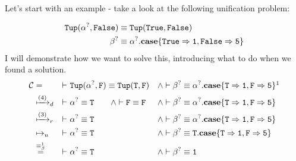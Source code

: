 \documentclass[twoside,12pt,a4paper]{article}
\begin{document}
Let's start with an example - take a look at the following unification problem:
\begin{example}[Unification]
    \begin{align*}
        \mathtt{Tup(\alpha^?, False)}&\equiv \mathtt{Tup(True, False)}\\
        \beta^?&\equiv \alpha^?.\textbf{case}\{\mathtt{True \Rightarrow 1, False\Rightarrow 5}\}
    \end{align*}        
    I will demonstrate how we want to solve this, introducing what to do when we found a solution.   
    \begin{align*}
        \constraints &= &\vdash\ & \mathtt{Tup(\alphaunifvar, F)}\equiv \mathtt{Tup(T, F)}&\wedge&
        \vdash \betaunifvar\equiv \alphaunifvar.\expatmatch{\mathtt{T \Rightarrow 1, F\Rightarrow 5}}\footnotemark[1]\\
        &\xmapsto{(4)}_d &\vdash\ & \mathtt{\alphaunifvar\equiv T}\qquad\wedge\vdash \mathtt{F\equiv F} &\wedge& 
        \vdash \betaunifvar\equiv \alphaunifvar.\expatmatch{\mathtt{T \Rightarrow 1, F\Rightarrow 5}}\\
        &\xmapsto{(3)}_r &\vdash\ & \mathtt{\alphaunifvar\equiv T} &\wedge& 
        \vdash \betaunifvar\equiv \alphaunifvar.\expatmatch{\mathtt{T \Rightarrow 1, F\Rightarrow 5}}\\
        &\mapsto_u &\vdash\ &\mathtt{\alphaunifvar\equiv T} &\wedge&
        \vdash \betaunifvar\equiv \mathtt{T}.\expatmatch{\mathtt{T \Rightarrow 1, F\Rightarrow 5}}\\
        &\stackrel{\betaconv}{=} &\vdash\ &\mathtt{\alphaunifvar\equiv T} &\wedge&
        \vdash \betaunifvar\equiv \mathtt{1}
    \end{align*}
\end{example}
\end{document}
